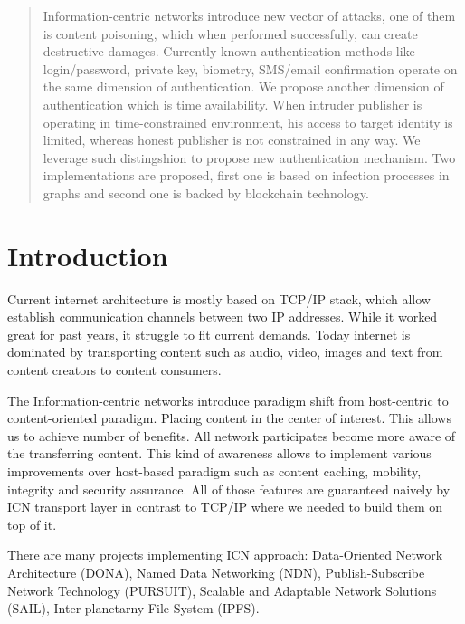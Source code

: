 \documentclass[nostrict]{szablonPG}
\begin{document}
\tableofcontents
\listoffigures


\begin{abstract}
Information-centric networks introduce new vector of attacks, one of them is content poisoning, which when performed successfully, can create destructive damages. Currently known authentication methods like login/password, private key, biometry, SMS/email confirmation operate on the same dimension of authentication. We propose another dimension of authentication which is time availability. When intruder publisher is operating in time-constrained environment, his access to target identity is limited, whereas honest publisher is not constrained in any way. We leverage such distingshion to propose new authentication mechanism. Two implementations are proposed, first one is based on infection processes in graphs and second one is backed by blockchain technology. 


\end{abstract}


\section{Introduction}
Current internet architecture is mostly based on TCP/IP stack, which allow  establish communication channels between two IP addresses. While it worked great for past years, it struggle to fit current demands. Today internet is dominated by transporting content such as audio, video, images and text from content creators to content consumers. 

The Information-centric networks introduce paradigm shift from host-centric to content-oriented paradigm. Placing content in the center of interest. This allows us to achieve number of benefits. All network participates become more aware of the transferring content. This kind of awareness allows to implement various improvements over host-based paradigm such as content caching, mobility, integrity and security assurance. All of those features are guaranteed naively by ICN transport layer in contrast to TCP/IP where we needed to build them on top of it. 

There are many projects implementing ICN approach: Data-Oriented Network Architecture (DONA), Named Data Networking (NDN), Publish-Subscribe Network Technology (PURSUIT), Scalable and Adaptable Network Solutions (SAIL), Inter-planetarny File System (IPFS).
\end{document}
